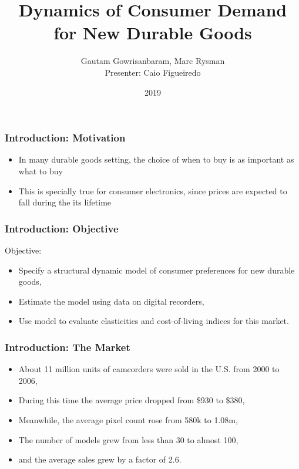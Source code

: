 \documentclass{beamer}
\title{Dynamics of Consumer Demand for New Durable Goods}
\author{Gautam Gowrisanbaram, Marc Rysman \\
Presenter: Caio Figueiredo}
\institute{Penn State}
\date{2019}
\theoremstyle{definition}
\begin{document}
\frame{\titlepage}

\begin{frame}
  \frametitle{Introduction: Motivation}

  \begin{itemize}
    \item In many durable goods setting, the choice of when to buy is as important
      as what to buy
    \item This is specially true for consumer electronics, since prices are
      expected to fall during the its lifetime
  \end{itemize}
\end{frame}

\begin{frame}
  \frametitle{Introduction: Objective}

  Objective:
  \begin{itemize}
    \item Specify a structural dynamic model of consumer
      preferences for new durable goods,
    \item Estimate the model using data on digital recorders,
    \item Use model to evaluate elasticities and cost-of-living indices for
      this market.
  \end{itemize}
\end{frame}

\begin{frame}
  \frametitle{Introduction: The Market}

  \begin{itemize}
  \item About 11 million units of camcorders were sold in the U.S. from 2000 to
    2006,
  \item During this time the average price dropped from \$930 to \$380,
  \item Meanwhile, the average pixel count rose from 580k to 1.08m,
  \item The number of models grew from less than 30 to almost 100,
  \item and the average sales grew by a factor of 2.6.
\end{itemize}
\end{frame}


\end{document}
